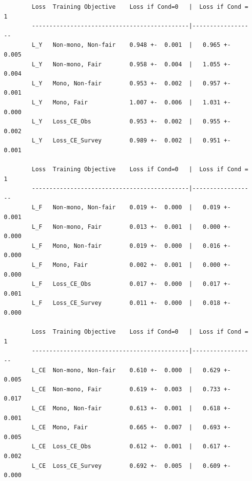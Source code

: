        \begin{verbatim}
        Loss  Training Objective    Loss if Cond=0   |  Loss if Cond = 1
        ---------------------------------------------|------------------
        L_Y   Non-mono, Non-fair    0.948 +-  0.001  |   0.965 +-  0.005
        L_Y   Non-mono, Fair        0.958 +-  0.004  |   1.055 +-  0.004
        L_Y   Mono, Non-fair        0.953 +-  0.002  |   0.957 +-  0.001
        L_Y   Mono, Fair            1.007 +-  0.006  |   1.031 +-  0.000
        L_Y   Loss_CE_Obs           0.953 +-  0.002  |   0.955 +-  0.002
        L_Y   Loss_CE_Survey        0.989 +-  0.002  |   0.951 +-  0.001
        
        Loss  Training Objective    Loss if Cond=0   |  Loss if Cond = 1
        ---------------------------------------------|------------------
        L_F   Non-mono, Non-fair    0.019 +-  0.000  |   0.019 +-  0.001
        L_F   Non-mono, Fair        0.013 +-  0.001  |   0.000 +-  0.000
        L_F   Mono, Non-fair        0.019 +-  0.000  |   0.016 +-  0.000
        L_F   Mono, Fair            0.002 +-  0.001  |   0.000 +-  0.000
        L_F   Loss_CE_Obs           0.017 +-  0.000  |   0.017 +-  0.001
        L_F   Loss_CE_Survey        0.011 +-  0.000  |   0.018 +-  0.000
        
        Loss  Training Objective    Loss if Cond=0   |  Loss if Cond = 1
        ---------------------------------------------|------------------
        L_CE  Non-mono, Non-fair    0.610 +-  0.000  |   0.629 +-  0.005
        L_CE  Non-mono, Fair        0.619 +-  0.003  |   0.733 +-  0.017
        L_CE  Mono, Non-fair        0.613 +-  0.001  |   0.618 +-  0.001
        L_CE  Mono, Fair            0.665 +-  0.007  |   0.693 +-  0.005
        L_CE  Loss_CE_Obs           0.612 +-  0.001  |   0.617 +-  0.002
        L_CE  Loss_CE_Survey        0.692 +-  0.005  |   0.609 +-  0.000
        \end{verbatim}
    
    

    
